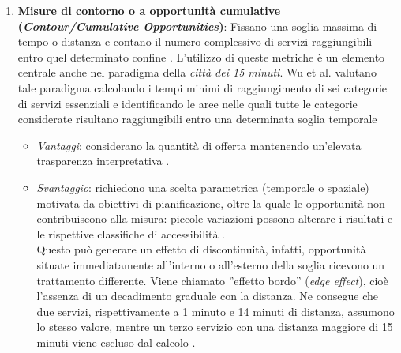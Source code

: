 \begin{enumerate}
    \begin{itemize}
        \item \textit{Vantaggi}: restituiscono un'unità di misura intuitiva (minuti o metri) e non richiedono la calibrazione di parametri comportamentali \cite{benassai2026}.
        \item \textit{Svantaggi}: ignorano la dimensione dell'offerta (avere un solo servizio o dieci servizi a 5 minuti produce il medesimo risultato). Inoltre non descrivono necessariamente le scelte effettive degli individui, che possono dipendere da caratteristiche e preferenze non considerate dalla metrica \cite{benassai2026,tariverdi2023}.
    \end{itemize}
    \item \textbf{Misure di contorno o a opportunità cumulative (\textit{Contour/Cumulative Opportunities})}: 
        Fissano una soglia massima di tempo o distanza e contano il numero complessivo di servizi raggiungibili entro quel determinato confine \cite{geurs2004,mazzulla2024}.
        L'utilizzo di queste metriche è un elemento centrale anche nel paradigma della \textit{città dei 15 minuti}. Wu et al. valutano tale paradigma calcolando i tempi minimi di raggiungimento di sei categorie di servizi essenziali e identificando le aree nelle quali tutte le categorie considerate risultano raggiungibili entro una determinata soglia temporale \cite{wu2025}
       \begin{itemize}
            \item \textit{Vantaggi}: considerano la quantità di offerta mantenendo un'elevata trasparenza interpretativa \cite{benassai2026}.
            \item \textit{Svantaggio}: richiedono una scelta parametrica (temporale o spaziale) motivata da obiettivi di pianificazione, oltre la quale le opportunità non contribuiscono alla misura: piccole variazioni possono alterare i risultati e le rispettive classifiche di accessibilità \cite{battiston2024}.\\
            Questo può generare un effetto di discontinuità, infatti, opportunità situate immediatamente all'interno o all'esterno della soglia ricevono un trattamento differente. Viene chiamato ''effetto bordo'' (\textit{edge effect}), cioè l'assenza di un decadimento graduale con la distanza. Ne consegue che due servizi, rispettivamente a 1 minuto e 14 minuti di distanza, assumono lo stesso valore, mentre un terzo servizio con una distanza maggiore di 15 minuti viene escluso dal calcolo \cite{geurs2004,mazzulla2024}.
        \end{itemize}
    

\end{enumerate}
